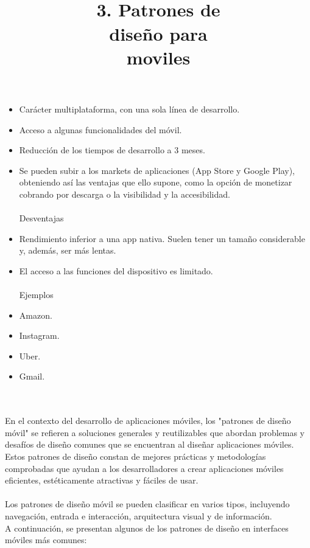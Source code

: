 \documentclass[12pt,twocolumn]{article}
\begin{document}
\begin{enumerate}
\begin{itemize}
		\item Carácter multiplataforma, con una sola línea de desarrollo.
		\item Acceso a algunas funcionalidades del móvil.
		\item Reducción de los tiempos de desarrollo a 3 meses.
		\item Se pueden subir a los markets de aplicaciones (App Store y Google Play), obteniendo así las ventajas que ello supone, como la opción de monetizar cobrando por descarga o la visibilidad y la accesibilidad.
		\\
		\\
		Desventajas
		\\
		\item Rendimiento inferior a una app nativa. Suelen tener un tamaño considerable y, además, ser más lentas.
		\item El acceso a las funciones del dispositivo es limitado.
		\\
		\\
		Ejemplos
		\\
		\item Amazon.
		\item Instagram.
		\item Uber.
		\item Gmail.
	\end{itemize}
\end{enumerate}

\title{\textbf{\huge 
		\\
		3. Patrones de 
		\\
		diseño para 
		\\
		moviles}}
\\
\\
En el contexto del desarrollo de aplicaciones móviles, los "patrones de diseño móvil" se refieren a soluciones generales y reutilizables que abordan problemas y desafíos de diseño comunes que se encuentran al diseñar aplicaciones móviles. Estos patrones de diseño constan de mejores prácticas y metodologías comprobadas que ayudan a los desarrolladores a crear aplicaciones móviles eficientes, estéticamente atractivas y fáciles de usar. 
\\
\\
Los patrones de diseño móvil se pueden clasificar en varios tipos, incluyendo navegación, entrada e interacción, arquitectura visual y de información.
\\
A continuación, se presentan algunos de los patrones de diseño en interfaces móviles más comunes:
\end{document}
